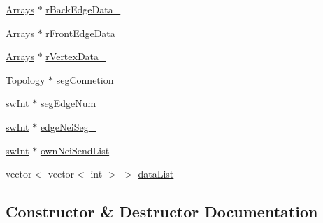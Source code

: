 \begin{DoxyCompactItemize}
\item 
\mbox{\hyperlink{structArrays}{Arrays}} $\ast$ \mbox{\hyperlink{classUNAT_1_1DirectSegmentIterator_aa195d7aa3c827b8d22a7d49143c5348d}{r\+Back\+Edge\+Data\+\_\+}}
\item 
\mbox{\hyperlink{structArrays}{Arrays}} $\ast$ \mbox{\hyperlink{classUNAT_1_1DirectSegmentIterator_ac9bdc15ceeefacb75de2195eff3c9a7f}{r\+Front\+Edge\+Data\+\_\+}}
\item 
\mbox{\hyperlink{structArrays}{Arrays}} $\ast$ \mbox{\hyperlink{classUNAT_1_1DirectSegmentIterator_aa304cb0c6f80306cb5703d404d14e704}{r\+Vertex\+Data\+\_\+}}
\item 
\mbox{\hyperlink{classUNAT_1_1Topology}{Topology}} $\ast$ \mbox{\hyperlink{classUNAT_1_1DirectSegmentIterator_ad6e6500dc855b0a5b22210d10b1957d9}{seg\+Connetion\+\_\+}}
\item 
\mbox{\hyperlink{include_2swMacro_8h_a113cf5f6b5377cdf3fac6aa4e443e9aa}{sw\+Int}} $\ast$ \mbox{\hyperlink{classUNAT_1_1DirectSegmentIterator_a9f3cd06a8039e4762e6ff90b64db5e0d}{seg\+Edge\+Num\+\_\+}}
\item 
\mbox{\hyperlink{include_2swMacro_8h_a113cf5f6b5377cdf3fac6aa4e443e9aa}{sw\+Int}} $\ast$ \mbox{\hyperlink{classUNAT_1_1DirectSegmentIterator_a38dbd9c56521852caa1b6e3dfc99694d}{edge\+Nei\+Seg\+\_\+}}
\item 
\mbox{\hyperlink{include_2swMacro_8h_a113cf5f6b5377cdf3fac6aa4e443e9aa}{sw\+Int}} $\ast$ \mbox{\hyperlink{classUNAT_1_1DirectSegmentIterator_a5682123ee52bf0dfe47fecf23d3d0e25}{own\+Nei\+Send\+List}}
\item 
vector$<$ vector$<$ int $>$ $>$ \mbox{\hyperlink{classUNAT_1_1DirectSegmentIterator_a96bc00457b3b7652b20ec92088dfc575}{data\+List}}
\end{DoxyCompactItemize}


\subsection{Constructor \& Destructor Documentation}
\mbox{\label{classUNAT_1_1DirectSegmentIterator_acf8859148e589468d895eccec1f693a4}} 
